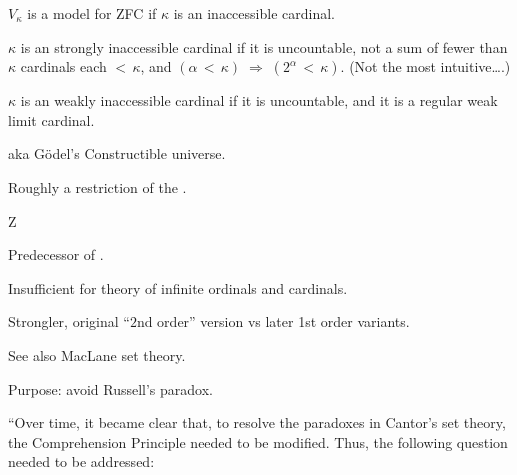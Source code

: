 $V_{\kappa}$ is a model for \textsf{ZFC} 
if $\kappa$ is an inaccessible cardinal\cite{wiki:Inaccessible_cardinal}.

$\kappa$ is an strongly inaccessible cardinal 
if it is uncountable, 
not a sum of fewer than $\kappa$ cardinals each $<\,\kappa$,
and
$(\alpha \,<\, \kappa) \;\Rightarrow\; (2^{\alpha}\,<\,\kappa)$.
(Not the most intuitive\ldots .)

$\kappa$ is an weakly inaccessible cardinal 
if it is uncountable,
and
it is a regular weak limit 
cardinal\cite{wiki:Regular_cardinal,wiki:Limit_cardinal}.

\label{sec:Constructible_universe}

aka G\"{o}del's Constructible 
universe\cite{wiki:Constructible_universe}.

Roughly a restriction of the . 

\label{sec:Zermelo_set_theory}

\textsf{Z}\cite{wiki:Zermelo_set_theory}

Predecessor of .

Insufficient for theory of infinite 
ordinals\cite{wiki:Ordinal_number}
and cardinals.

Strongler, original ``$2$nd order'' version 
vs  later 1st order variants.

See also MacLane set theory\cite{maclane:mff:1986}.
\label{sec:Zermelo-Fraenkel-set-theory}

Purpose: avoid Russell's paradox\cite{wiki:Russell-paradox}.

``Over time, it became clear that, to resolve the 
paradoxes in Cantor’s set theory, the Comprehension Principle 
needed to be modified. Thus, the following question needed to 
be addressed:

